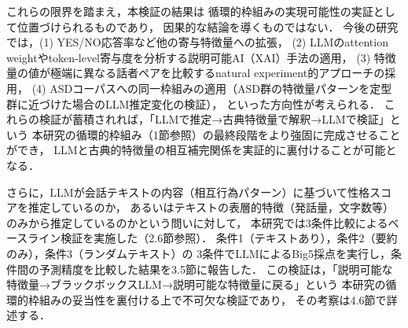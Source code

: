 \documentclass[dvipdfmx,11pt,a4paper]{bxjsarticle}
\renewcommand{\_}{\paperorigunderscore\allowbreak}%
\begin{document}
これらの限界を踏まえ，本検証の結果は
循環的枠組みの実現可能性の実証として位置づけられるものであり，
因果的な結論を導くものではない．
今後の研究では，(1) YES/NO応答率など他の寄与特徴量への拡張，
(2) LLMのattention weightやtoken-level寄与度を分析する説明可能AI（XAI）手法の適用，
(3) 特徴量の値が極端に異なる話者ペアを比較するnatural experiment的アプローチの採用，
(4) ASDコーパスへの同一枠組みの適用（ASD群の特徴量パターンを定型群に近づけた場合のLLM推定変化の検証），
といった方向性が考えられる．
これらの検証が蓄積されれば，「LLMで推定→古典特徴量で解釈→LLMで検証」という
本研究の循環的枠組み（1節参照）の最終段階をより強固に完成させることができ，
LLMと古典的特徴量の相互補完関係を実証的に裏付けることが可能となる．

さらに，LLMが会話テキストの内容（相互行為パターン）に基づいて性格スコアを推定しているのか，
あるいはテキストの表層的特徴（発話量，文字数等）のみから推定しているのかという問いに対して，
本研究では3条件比較によるベースライン検証を実施した（2.6節参照）．
条件1（テキストあり），条件2（要約のみ），条件3（ランダムテキスト）の
3条件でLLMによるBig5採点を実行し，条件間の予測精度を比較した結果を3.5節に報告した．
この検証は，「説明可能な特徴量→ブラックボックスLLM→説明可能な特徴量に戻る」という
本研究の循環的枠組みの妥当性を裏付ける上で不可欠な検証であり，
その考察は4.6節で詳述する．

\clearpage  %
\end{document}
